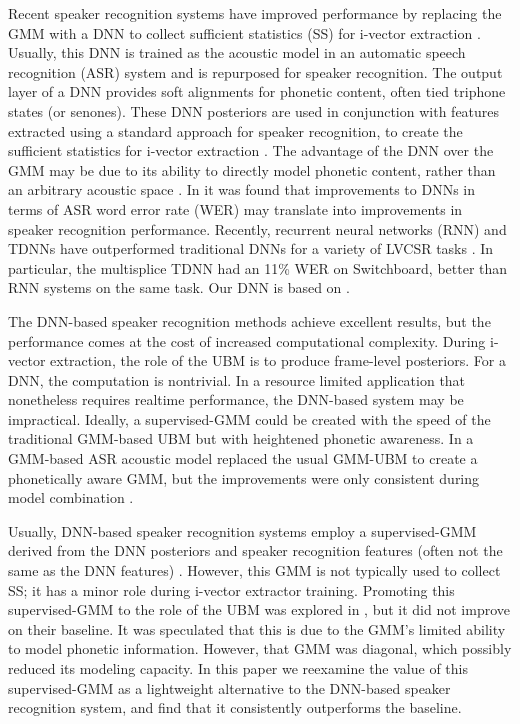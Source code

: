 \documentclass{article}
\begin{document}
Recent speaker recognition systems have improved performance by replacing 
the GMM with a DNN to collect sufficient statistics (SS) for i-vector extraction \cite{lei2014, garcia2014}. 
Usually, this DNN is trained as the acoustic model in
an automatic speech recognition (ASR) system and is repurposed for
speaker recognition.
The output layer of a DNN provides soft alignments for
phonetic content, often tied triphone states (or senones). 
These DNN posteriors are used in conjunction with features extracted using a 
standard approach for speaker recognition, to create the sufficient statistics
for i-vector extraction \cite{ivector}.
The advantage of the DNN over the GMM may
be due to its ability to directly model phonetic content, rather than an arbitrary
acoustic space \cite{lei2014, garcia2014, kenny2014deep}. In \cite{garcia2014} it was found that
improvements to DNNs in terms of ASR word error rate (WER) may translate into 
improvements in speaker
recognition performance. Recently, recurrent neural networks (RNN) and TDNNs \cite{tdnn} have
outperformed traditional DNNs for a variety of LVCSR tasks \cite{lstm, saon2014, multisplice}.
In particular, the multisplice TDNN \cite{multisplice} had an 11\% WER
on Switchboard, better than RNN systems on the same task.
Our DNN is based on \cite{multisplice}. 

The DNN-based speaker recognition methods achieve excellent results, but the
performance comes at the cost of increased computational complexity. During
i-vector extraction, the role of the UBM is to produce frame-level posteriors.
For a DNN, the computation is nontrivial. In a resource limited application
that nonetheless requires realtime performance, the DNN-based system may
be impractical. Ideally, a supervised-GMM could be created with the 
speed of the traditional GMM-based UBM but with heightened phonetic awareness.
In \cite{omar2010} a GMM-based ASR acoustic model replaced the usual GMM-UBM
to create a phonetically aware GMM, but the improvements were only consistent
during model combination \cite{omar2010}.

Usually, DNN-based speaker recognition systems employ a supervised-GMM
derived from the DNN posteriors and speaker recognition features (often
not the same as the DNN features) \cite{lei2014, garcia2014, kenny2014deep}.
However, this GMM is not typically
used to collect SS; it has a minor role during i-vector extractor training.
Promoting this supervised-GMM to the role of the UBM was explored
in \cite{lei2014}, but it did not improve on their baseline.
It was speculated that this is due
to the GMM's limited ability to model phonetic information. However,
that GMM was diagonal, which possibly
reduced its modeling capacity. In this paper we reexamine the 
value of this supervised-GMM as a lightweight alternative to the DNN-based
speaker recognition system, and find that it consistently outperforms the
baseline.
\end{document}
